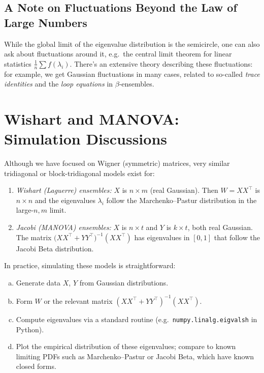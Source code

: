 \documentclass[letterpaper,11pt,oneside,reqno]{article}
\numberwithin{equation}{section}
\theoremstyle{definition}
\begin{document}
\subsection{A Note on Fluctuations Beyond the Law of Large Numbers}

While the global limit of the eigenvalue distribution is the semicircle, one can also ask about fluctuations around it, e.g.\ the central limit theorem for linear statistics $\frac{1}{n}\sum f(\lambda_i)$. There's an extensive theory describing these fluctuations: for example, we get Gaussian fluctuations in many cases, related to so-called \emph{trace identities} and the \emph{loop equations} in $\beta$-ensembles.

\section{Wishart and MANOVA: Simulation Discussions}
\label{sec:wishart-manova}

Although we have focused on Wigner (symmetric) matrices, very similar tridiagonal or block-tridiagonal models exist for:
\begin{enumerate}[(1)]
\item \emph{Wishart (Laguerre) ensembles:} $X$ is $n\times m$ (real Gaussian). Then $W=XX^\top$ is $n\times n$ and the eigenvalues $\lambda_i$ follow the Marchenko–Pastur distribution in the large-$n,m$ limit.
\item \emph{Jacobi (MANOVA) ensembles:} $X$ is $n\times t$ and $Y$ is $k\times t$, both real Gaussian. The matrix $\bigl(X X^\top + Y Y^\top\bigr)^{-1}(X X^\top)$ has eigenvalues in $[0,1]$ that follow the Jacobi Beta distribution.
\end{enumerate}

In practice, simulating these models is straightforward:

\begin{enumerate}[(a)]
\item Generate data $X$, $Y$ from Gaussian distributions.
\item Form $W$ or the relevant matrix $(X X^\top + Y Y^\top)^{-1} (X X^\top)$.
\item Compute eigenvalues via a standard routine (e.g.\ \texttt{numpy.linalg.eigvalsh} in Python).
\item Plot the empirical distribution of these eigenvalues; compare to known limiting PDFs such as Marchenko–Pastur or Jacobi Beta, which have known closed forms.
\end{enumerate}
\end{document}
